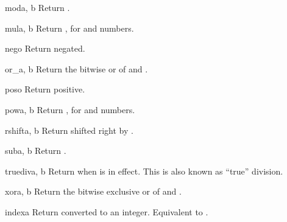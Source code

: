 \begin{funcdesc}{mod}{a, b}
Return  \code{\%} .
\end{funcdesc}

\begin{funcdesc}{mul}{a, b}
Return  \code{*} , for  and  numbers.
\end{funcdesc}

\begin{funcdesc}{neg}{o}
Return  negated.
\end{funcdesc}

\begin{funcdesc}{or_}{a, b}
Return the bitwise or of  and .
\end{funcdesc}

\begin{funcdesc}{pos}{o}
Return  positive.
\end{funcdesc}

\begin{funcdesc}{pow}{a, b}
Return  \code{**} , for  and  numbers.
\end{funcdesc}

\begin{funcdesc}{rshift}{a, b}
Return  shifted right by .
\end{funcdesc}

\begin{funcdesc}{sub}{a, b}
Return  \code{-} .
\end{funcdesc}

\begin{funcdesc}{truediv}{a, b}
Return  \code{/}  when  is in
effect.  This is also known as ``true'' division.
\end{funcdesc}

\begin{funcdesc}{xor}{a, b}
Return the bitwise exclusive or of  and .
\end{funcdesc}

\begin{funcdesc}{index}{a}
Return  converted to an integer.  Equivalent to .
\end{funcdesc}

